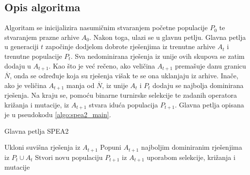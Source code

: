 \documentclass[times, utf8, zavrsni, numeric]{fer}
\begin{document}
\subsection{Opis algoritma}
Algoritam se inicijalizira nasumičnim stvaranjem početne populacije $P_0$ te stvaranjem prazne arhive $A_0$. Nakon toga, ulazi se u glavnu petlju. Glavna petlja u generaciji $t$ započinje dodjelom dobrote rješenjima iz trenutne arhive $A_t$ i trenutne populacije $P_t$. Sva nedominirana rješenja iz unije ovih skupova se zatim dodaju u $A_{t+1}$. Kao što je već rečeno, ako veličina $A_{t+1}$ premašuje danu granicu $\overline{N}$, onda se određuje koja su rješenja višak te se ona uklanjaju iz arhive. Inače, ako je veličina $A_{t+1}$ manja od $\overline{N}$, iz unije $A_t$ i $P_t$ dodaju se najbolja dominirana rješenja. Na kraju se, pomoću binarne turnirske selekcije te zadanih operatora križanja i mutacije, iz $A_{t+1}$ stvara iduća populacija $P_{t+1}$. Glavna petlja opisana je u pseudokodu \ref{algo:spea2_main}.\\

\begin{algorithm}
\caption{Glavna petlja SPEA2}
\label{algo:spea2_main}
\begin{algorithmic}
\STATE Ukloni suvišna rješenja iz $A_{t+1}$
\STATE Popuni $A_{t+1}$ najboljim dominiranim rješenjima iz $P_t \cup A_t$
\ENDIF
\STATE Stvori novu populaciju $P_{t+1}$ iz $A_{t+1}$ uporabom selekcije, križanja i mutacije
\end{algorithmic}
\end{algorithm}
\end{document}
